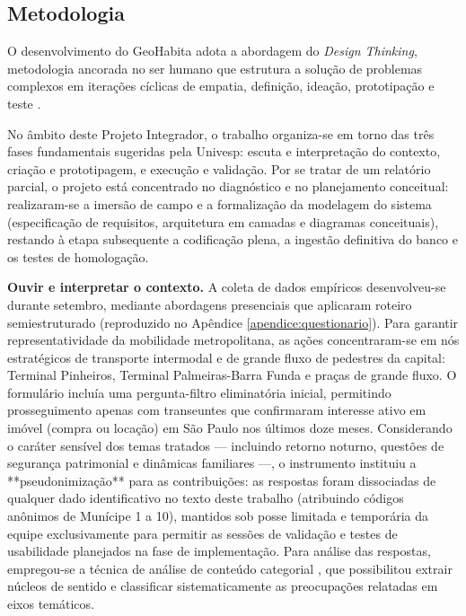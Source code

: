 \documentclass[
    12pt,
    oneside,            %
    a4paper,
    brazilian
    ]{abntex2}
\begin{document}
\subsection{Metodologia}

O desenvolvimento do GeoHabita adota a abordagem do \emph{Design Thinking}, metodologia ancorada no ser humano que estrutura a solução de problemas complexos em iterações cíclicas de empatia, definição, ideação, prototipação e teste \cite{brown2010}.

No âmbito deste Projeto Integrador, o trabalho organiza-se em torno das três fases fundamentais sugeridas pela Univesp: escuta e interpretação do contexto, criação e prototipagem, e execução e validação. Por se tratar de um relatório parcial, o projeto está concentrado no diagnóstico e no planejamento conceitual: realizaram-se a imersão de campo e a formalização da modelagem do sistema (especificação de requisitos, arquitetura em camadas e diagramas conceituais), restando à etapa subsequente a codificação plena, a ingestão definitiva do banco e os testes de homologação.

\textbf{Ouvir e interpretar o contexto.} A coleta de dados empíricos desenvolveu-se durante setembro,
mediante abordagens presenciais que aplicaram roteiro semiestruturado (reproduzido no Apêndice \ref{apendice:questionario}). Para garantir representatividade da mobilidade metropolitana, as ações concentraram-se em nós estratégicos de transporte intermodal e de grande fluxo de pedestres da capital: Terminal Pinheiros, Terminal Palmeiras-Barra Funda e praças de grande fluxo. O formulário incluía uma pergunta-filtro eliminatória inicial, permitindo prosseguimento apenas com transeuntes que confirmaram interesse ativo em imóvel (compra ou locação) em São Paulo nos últimos doze meses. Considerando o caráter sensível dos temas tratados — incluindo retorno noturno, questões de segurança patrimonial e dinâmicas familiares —, o instrumento instituiu a **pseudonimização** para as contribuições: as respostas foram dissociadas de qualquer dado identificativo no texto deste trabalho (atribuindo códigos anônimos de Munícipe 1 a 10), mantidos sob posse limitada e temporária da equipe exclusivamente para permitir as sessões de validação e testes de usabilidade planejados na fase de implementação. Para análise das respostas, empregou-se a técnica de análise de conteúdo categorial \cite{bardin2016}, que possibilitou extrair núcleos de sentido e classificar sistematicamente as preocupações relatadas em eixos temáticos.
\end{document}
